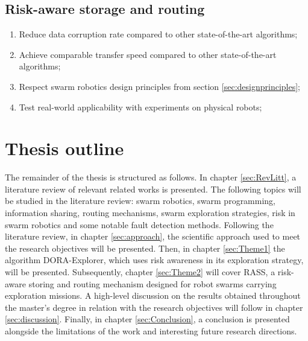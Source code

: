 \subsection{Risk-aware storage and routing}
\begin{enumerate}
    \item Reduce data corruption rate compared to other state-of-the-art algorithms;
    \item Achieve comparable transfer speed compared to other state-of-the-art algorithms;
    \item Respect swarm robotics design principles from section \ref{sec:designprinciples};
    \item Test real-world applicability with experiments on physical robots;
\end{enumerate}


\section{Thesis outline}
The remainder of the thesis is structured as follows. In chapter \ref{sec:RevLitt}, a literature review of relevant related works is presented. The following topics will be studied in the literature review: swarm robotics, swarm programming, information sharing, routing mechanisms, swarm exploration strategies, risk in swarm robotics and some notable fault detection methods. Following the literature review, in chapter \ref{sec:approach}, the scientific approach used to meet the research objectives will be presented. Then, in chapter \ref{sec:Theme1} the algorithm DORA-Explorer, which uses risk awareness in its exploration strategy, will be presented. Subsequently, chapter \ref{sec:Theme2} will cover RASS, a risk-aware storing and routing mechanism designed for robot swarms carrying exploration missions. A high-level discussion on the results obtained throughout the master's degree in relation with the research objectives will follow in chapter \ref{sec:discussion}. Finally, in chapter \ref{sec:Conclusion}, a conclusion is presented alongside the limitations of the work and interesting future research directions.
